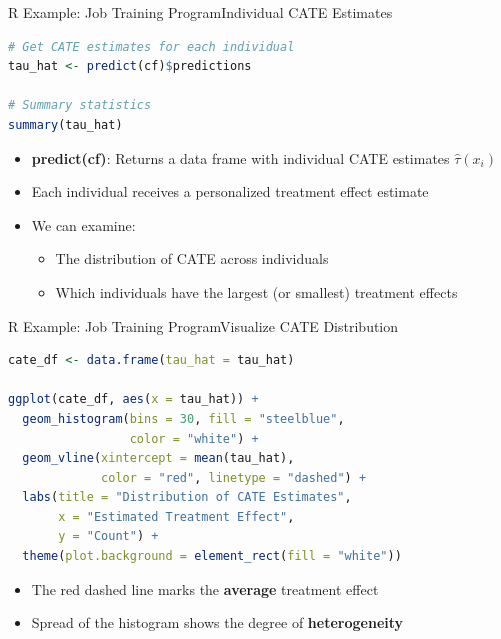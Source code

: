 \documentclass[dvipsnames,hyperref={pdfpagelabels=false}]{beamer}
\begin{document}
\begin{frame}[fragile]{R Example: Job Training Program}{Individual CATE Estimates}
\begin{lstlisting}[language=R]
# Get CATE estimates for each individual
tau_hat <- predict(cf)$predictions

# Summary statistics
summary(tau_hat)
\end{lstlisting}
	\begin{itemize}
		\item \textbf{predict(cf)}: Returns a data frame with individual CATE estimates $\hat{\tau}(x_i)$
		\vspace{0.2cm}
		\item Each individual receives a personalized treatment effect estimate
		\vspace{0.3cm}
		\item We can examine:
		\vspace{0.2cm}
		\begin{itemize}
			\item The distribution of CATE across individuals
			\vspace{0.2cm}
			\item Which individuals have the largest (or smallest) treatment effects
		\end{itemize}
	\end{itemize}
\end{frame}




\begin{frame}[fragile]{R Example: Job Training Program}{Visualize CATE Distribution}
\begin{lstlisting}[language=R]
cate_df <- data.frame(tau_hat = tau_hat)

ggplot(cate_df, aes(x = tau_hat)) +
  geom_histogram(bins = 30, fill = "steelblue",
                 color = "white") +
  geom_vline(xintercept = mean(tau_hat),
             color = "red", linetype = "dashed") +
  labs(title = "Distribution of CATE Estimates",
       x = "Estimated Treatment Effect",
       y = "Count") +
  theme(plot.background = element_rect(fill = "white"))
\end{lstlisting}
	\begin{itemize}
		\item The red dashed line marks the \textbf{average} treatment effect
		\vspace{0.2cm}
		\item Spread of the histogram shows the degree of \textbf{heterogeneity}
	\end{itemize}
\end{frame}
\end{document}
